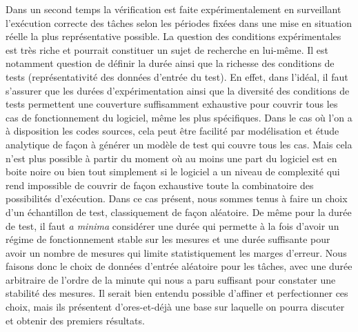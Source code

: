 \documentclass[french, a4paper, 11pt, twoside, pdftex]{StyleThese}
\begin{document}
		Dans un second temps la vérification est faite expérimentalement en surveillant l'exécution correcte des tâches selon les périodes fixées dans une mise en situation réelle la plus représentative possible.
		La question des conditions expérimentales est très riche et pourrait constituer un sujet de recherche en lui-même. Il est notamment question de définir la durée ainsi que la richesse des conditions de tests (représentativité des données d'entrée du test). En effet, dans l'idéal, il faut s'assurer que les durées d'expérimentation ainsi que la diversité des conditions de tests permettent une couverture suffisamment exhaustive pour couvrir tous les cas de fonctionnement du logiciel, même les plus spécifiques. 
		Dans le cas où l'on a à disposition les codes sources, cela peut être facilité par modélisation et étude analytique de façon à générer un modèle de test qui couvre tous les cas. Mais cela n'est plus possible à partir du moment où au moins une part du logiciel est en boite noire ou bien tout simplement si le logiciel a un niveau de complexité qui rend impossible de couvrir de façon exhaustive toute la combinatoire des possibilités d'exécution. Dans ce cas présent, nous sommes tenus à faire un choix d'un échantillon de test, classiquement de façon aléatoire. De même pour la durée de test, il faut \textit{a minima} considérer une durée qui permette à la fois d'avoir un régime de fonctionnement stable sur les mesures et une durée suffisante pour avoir un nombre de mesures qui limite statistiquement les marges d'erreur.
		Nous faisons donc le choix de données d'entrée aléatoire pour les tâches, avec une durée arbitraire de l'ordre de la minute qui nous a paru suffisant pour constater une stabilité des mesures. Il serait bien entendu possible d'affiner et perfectionner ces choix, mais ils présentent d'ores-et-déjà une base sur laquelle on pourra discuter et obtenir des premiers résultats.
		
		
\end{document}
